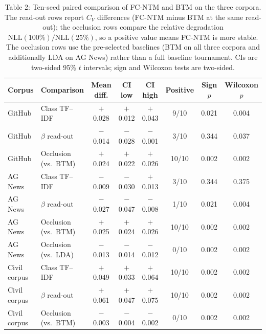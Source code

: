 \documentclass[Journal,letterpaper,NoLists]{ascelike-new}
\begin{document}
\begin{table}[t]
\centering
\caption{Table 2: Ten-seed paired comparison of FC-NTM and BTM on the three corpora. The read-out rows report $C_V$ differences (FC-NTM minus BTM at the same read-out); the occlusion rows compare the relative degradation $\mathrm{NLL}(100\%)/\mathrm{NLL}(25\%)$, so a positive value means FC-NTM is more stable. The occlusion rows use the pre-selected baselines (BTM on all three corpora and additionally LDA on AG News) rather than a full baseline tournament. CIs are two-sided 95\% $t$ intervals; sign and Wilcoxon tests are two-sided.}
\label{tab:seed-paired}
\footnotesize
\setlength{\tabcolsep}{3pt}
\begin{tabular}{@{}llcccccc@{}}
\toprule
Corpus & Comparison & Mean diff. & CI low & CI high & Positive & Sign $p$ & Wilcoxon $p$ \\
\midrule
GitHub & Class TF--IDF & $+$0.028 & $+$0.012 & $+$0.043 & 9/10 & 0.021 & 0.004 \\
GitHub & $\beta$ read-out & $-$0.014 & $-$0.028 & $-$0.001 & 3/10 & 0.344 & 0.037 \\
GitHub & Occlusion (vs.\ BTM) & $+$0.024 & $+$0.022 & $+$0.026 & 10/10 & 0.002 & 0.002 \\
\midrule
AG News & Class TF--IDF & $-$0.009 & $-$0.030 & $+$0.013 & 3/10 & 0.344 & 0.375 \\
AG News & $\beta$ read-out & $-$0.027 & $-$0.047 & $-$0.008 & 1/10 & 0.021 & 0.004 \\
AG News & Occlusion (vs.\ BTM) & $+$0.025 & $+$0.024 & $+$0.026 & 10/10 & 0.002 & 0.002 \\
AG News & Occlusion (vs.\ LDA) & $-$0.013 & $-$0.014 & $-$0.012 & 0/10 & 0.002 & 0.002 \\
\midrule
Civil corpus & Class TF--IDF & $+$0.049 & $+$0.033 & $+$0.064 & 10/10 & 0.002 & 0.002 \\
Civil corpus & $\beta$ read-out & $+$0.061 & $+$0.047 & $+$0.075 & 10/10 & 0.002 & 0.002 \\
Civil corpus & Occlusion (vs.\ BTM) & $-$0.003 & $-$0.004 & $-$0.002 & 0/10 & 0.002 & 0.002 \\
\bottomrule
\end{tabular}
\end{table}
\end{document}
